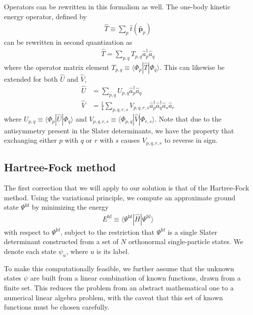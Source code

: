 \documentclass[amsmath, amssymb, aps, floatfix, nofootinbib, preprintnumbers,showpacs, superscriptaddress, twocolumn]{revtex4-1}
\begin{document}
Operators can be rewritten in this formalism as well.  The one-body kinetic
energy operator, defined by
\begin{align*}
  \hat T \equiv \sum_p \hat t(\hat{\bm p}_p)
\end{align*}
can be rewritten in second quantization as
\begin{align*}
  \hat T = \sum_{p, q} T_{p, q}^{} \hat a_p^\dagger \hat a_q^{}
\end{align*}
where the operator matrix element
$T_{p, q} \equiv \langle \Phi_p | \hat T | \Phi_q \rangle$.  This can likewise
be extended for both $\hat U$ and $\hat V$,
\begin{align*}
  \hat U &= \sum_{p, q} U_{p, q}^{} \hat a_p^\dagger \hat a_q^{} \\
  \hat V &= \frac{1}{4} \sum_{p, q, r, s} V_{p, q, r, s}^{}
  \hat a_p^\dagger \hat a_q^\dagger \hat a_s^{} \hat a_r^{}
\end{align*}
where $U_{p, q} \equiv \langle \Phi_p | \hat U | \Phi_q \rangle$ and
$V_{p, q, r, s} \equiv \langle \Phi_{p, q} | \hat V | \Phi_{r, s} \rangle$.
Note that due to the antisymmetry present in the Slater determinants, we have
the property that exchanging either $p$ with $q$ or $r$ with $s$ causes
$V_{p, q, r, s}$ to reverse in sign.

\subsection{Hartree-Fock method}
\label{subsec:HartreeFockmethod}

The first correction that we will apply to our solution is that of the
Hartree-Fock method.  Using the variational principle, we compute an
approximate ground state $\Psi^{\text{hf}}$ by minimizing the energy
\begin{align*}
  E^{\text{hf}} \equiv \langle \Psi^{\text{hf}} | \hat H | \Psi^{\text{hf}} \rangle
\end{align*}
with respect to $\Psi^{\text{hf}}$, subject to the restriction that
$\Psi^{\text{hf}}$ is a single Slater determinant constructed from a set of
$N$ orthonormal single-particle states.  We denote each state $\psi_u$, where
$u$ is its label.

To make this computationally feasible, we further assume that the unknown
states $\psi$ are built from a linear combination of known functions,
drawn from a finite set.  This reduces the problem from an abstract
mathematical one to a numerical linear algebra problem, with the caveat that
this set of known functions must be chosen carefully.
\end{document}
